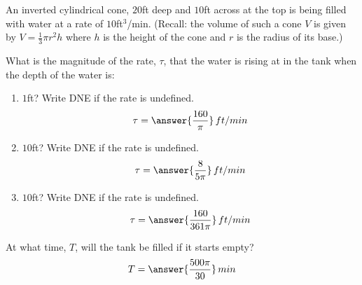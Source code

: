 \documentclass{ximera}
\author{Gregory Hartman \and Matthew Carr}
\begin{document}
\begin{exercise}




An inverted cylindrical cone, $20$ft deep and $10$ft across at the top is being filled with water at a rate of $10$ft$^3$/min. (Recall: the volume of such a cone $V$ is given by $V=\frac{1}{3}\pi r^2 h$ where $h$ is the height of the cone and $r$ is the radius of its base.)

What is the magnitude of the rate, $\tau$, that the water is rising at in the tank when the depth of the water is:
\begin{enumerate}
\item		$1$ft? Write DNE if the rate is undefined. \[\tau=\answer{\frac{160}{\pi}}\,ft/min\]
\item		$10$ft? Write DNE if the rate is undefined.
 \[\tau=\answer{\frac{8}{5\pi}}\,ft/min\]
\item		$10$ft? Write DNE if the rate is undefined. \[\tau=\answer{\frac{160}{361\pi}}\,ft/min\]
\end{enumerate}

At what time, $T$, will the tank be filled if it starts empty?
\[
T=\answer{\frac{500\pi}{30}}\,min
\]


\end{exercise}
\end{document}
